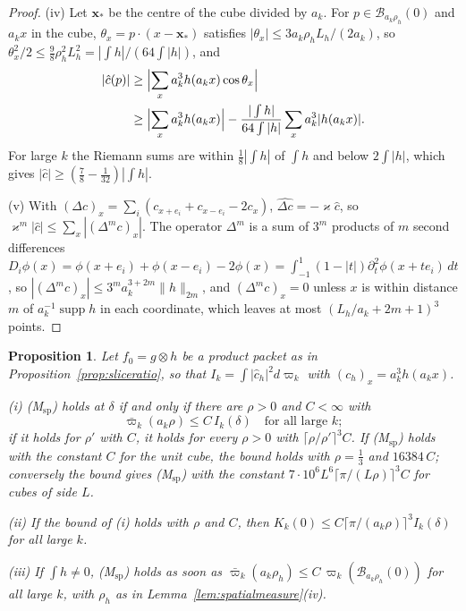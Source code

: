 \documentclass[aps,prd,twocolumn,superscriptaddress,nofootinbib,longbibliography,floatfix,amsmath,amssymb,10pt]{revtex4-2}
\newtheorem{proposition}[theorem]{Proposition}
\theoremstyle{definition}
\theoremstyle{remark}
\begin{document}
\begin{proof}
(iv) Let $\mathbf x_*$ be the centre of the cube divided by $a_k$. For
$p\in\mathcal B_{a_k\rho_h}(0)$ and $a_kx$ in the cube, $\theta_x=p\cdot
(x-\mathbf x_*)$ satisfies $|\theta_x|\le3a_k\rho_hL_h/(2a_k)$, so
$\theta_x^2/2\le\frac98\rho_h^2L_h^2=|\int h|/(64\int|h|)$, and
\[
\begin{split}
|\hat c(p)|&\ge\Bigl|\sum_xa_k^3h(a_kx)\cos\theta_x\Bigr|\\
&\ge\Bigl|\sum_xa_k^3h(a_kx)\Bigr|-\frac{|\int h|}{64\int|h|}\sum_x
a_k^3|h(a_kx)| .
\end{split}
\]
For large $k$ the Riemann sums are within $\frac18|\int h|$ of $\int h$
and below $2\int|h|$, which gives $|\hat c|\ge(\frac78-\frac1{32})|\int h|$.

(v) With $(\Delta c)_x=\sum_i(c_{x+e_i}+c_{x-e_i}-2c_x)$,
$\widehat{\Delta c}=-\varkappa\hat c$, so $\varkappa^m|\hat c|\le\sum_x|(\Delta^mc)
_x|$. The operator $\Delta^m$ is a sum of $3^m$ products of $m$ second
differences $D_i\phi(x)=\phi(x+e_i)+\phi(x-e_i)-2\phi(x)=\int_{-1}^1(1-|t|)
\partial_t^2\phi(x+te_i)\,dt$, so $|(\Delta^mc)_x|\le3^ma_k^{3+2m}
\|h\|_{2m}$, and $(\Delta^mc)_x=0$ unless $x$ is within distance $m$ of
$a_k^{-1}\operatorname{supp}h$ in each coordinate, which leaves at most
$(L_h/a_k+2m+1)^3$ points.
\end{proof}

\begin{proposition}\label{prop:boxform}
Let $f_0=g\otimes h$ be a product packet as in
Proposition~\textup{\ref{prop:sliceratio}}, so that $I_k=\int|\hat c_h|^2
d\varpi_k$ with $(c_h)_x=a_k^3h(a_kx)$.

\textup{(i)} \textup{(M$_{\mathrm{sp}}$)} holds at $\delta$ if and only if
there are $\rho>0$ and $C<\infty$ with
\[
\bar\varpi_k(a_k\rho)\le C\,I_k(\delta)\quad\text{for all large }k ;
\]
if it holds for $\rho'$ with $C$, it holds for every $\rho>0$ with
$\lceil\rho/\rho'\rceil^3C$. If
\textup{(M$_{\mathrm{sp}}$)} holds with the constant $C$ for the unit cube,
the bound holds with $\rho=\frac13$ and $16384\,C$; conversely the bound
gives \textup{(M$_{\mathrm{sp}}$)} with the constant $7\cdot10^6L^6\lceil
\pi/(L\rho)\rceil^3C$ for cubes of side $L$.

\textup{(ii)} If the bound of \textup{(i)} holds with $\rho$ and $C$, then
$K_k(0)\le C\lceil\pi/(a_k\rho)\rceil^3I_k(\delta)$ for all large $k$.

\textup{(iii)} If $\int h\ne0$, \textup{(M$_{\mathrm{sp}}$)} holds as soon
as $\bar\varpi_k(a_k\rho_h)\le C\,\varpi_k(\mathcal B_{a_k\rho_h}(0))$ for
all large $k$, with $\rho_h$ as in Lemma~\textup{\ref{lem:spatialmeasure}(iv)}.
\end{proposition}
\end{document}
